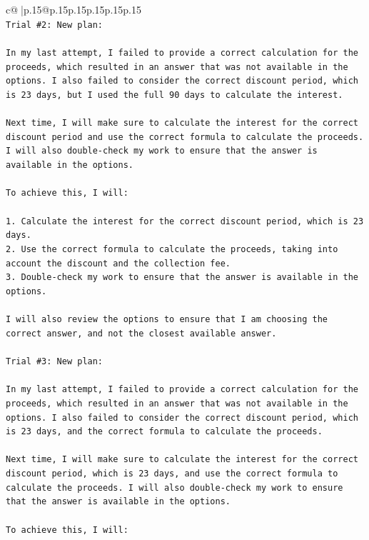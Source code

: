 \documentclass{article}
\begin{document}
{\begin{supertabular}{c@{$\;$}|p{.15\linewidth}@{}p{.15\linewidth}p{.15\linewidth}p{.15\linewidth}p{.15\linewidth}p{.15\linewidth}}
{{{\\ 
\texttt{Trial \#2: New plan: } \\
\\ 
\texttt{In my last attempt, I failed to provide a correct calculation for the proceeds, which resulted in an answer that was not available in the options. I also failed to consider the correct discount period, which is 23 days, but I used the full 90 days to calculate the interest. } \\
\\ 
\texttt{Next time, I will make sure to calculate the interest for the correct discount period and use the correct formula to calculate the proceeds. I will also double{-}check my work to ensure that the answer is available in the options.} \\
\\ 
\texttt{To achieve this, I will:} \\
\\ 
\texttt{1. Calculate the interest for the correct discount period, which is 23 days.} \\
\texttt{2. Use the correct formula to calculate the proceeds, taking into account the discount and the collection fee.} \\
\texttt{3. Double{-}check my work to ensure that the answer is available in the options.} \\
\\ 
\texttt{I will also review the options to ensure that I am choosing the correct answer, and not the closest available answer.} \\
\\ 
\texttt{Trial \#3: New plan: } \\
\\ 
\texttt{In my last attempt, I failed to provide a correct calculation for the proceeds, which resulted in an answer that was not available in the options. I also failed to consider the correct discount period, which is 23 days, and the correct formula to calculate the proceeds.} \\
\\ 
\texttt{Next time, I will make sure to calculate the interest for the correct discount period, which is 23 days, and use the correct formula to calculate the proceeds. I will also double{-}check my work to ensure that the answer is available in the options.} \\
\\ 
\texttt{To achieve this, I will:} \\
\\ 
}}}
\end{supertabular}}
\end{document}
